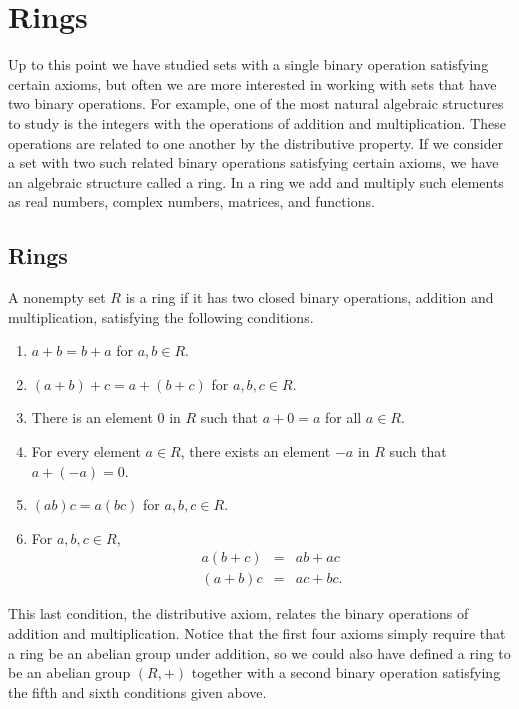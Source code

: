\chapter{Rings}\label{rings}
 
Up to this point we have studied sets with a single binary operation
satisfying certain axioms, but often we are more interested in working
with sets that have two binary operations.  For example, one of the
most natural algebraic structures to study is the integers 
with the operations of addition and multiplication. These operations
are related to one another by the distributive
property. If we consider a set with two such related binary operations
satisfying certain axioms, we have an algebraic structure called a
ring. In a ring we add and multiply such elements as real numbers,
complex numbers, matrices, and functions. 
 

\section{Rings}

A nonempty set $R$ is a {\bfi ring\/} if
it has two closed binary operations, addition and multiplication,
satisfying the following conditions.  
\begin{enumerate}
 
\item
$a + b = b + a$ for $a, b \in R$.
 
\item
$(a + b) + c = a + ( b + c)$ for $a, b, c  \in R$.
 
\item
There is an element $0$ in $R$ such that $a + 0 = a$ for all $a \in
R$. 
 
\item
For every element $a \in R$, there exists an element $-a$ in $R$ such
that $a + (-a) = 0$. 
 
\item
$(ab)  c = a  ( b  c)$ for $a, b, c  \in R$.
 
\item
For $a, b, c \in R$,
\begin{eqnarray*}
a( b + c)&  = & ab +ac \\
(a + b)c & = & ac + bc.
\end{eqnarray*}
 
\end{enumerate}
This last condition, the distributive axiom, relates the binary
operations of addition and multiplication. Notice that the first four
axioms simply require that a ring be an abelian group under addition,
so we could also have defined a ring to be an abelian group
$(R, +)$ together with a second binary operation satisfying the fifth
and sixth conditions given above.  
 
